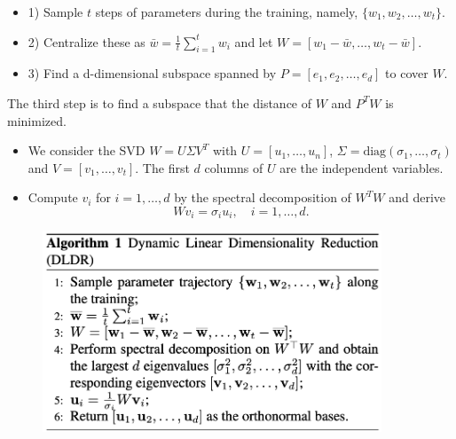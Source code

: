 \documentclass[t]{beamer}
\begin{document}
\begin{frame}
 \vspace{1cm}
\begin{itemize}
\item 1) Sample $t$ steps of parameters during the training, namely, $\{w_1, w_2, \dots , w_t \}$. \vspace{0,2cm}
\item 2) Centralize these as $\bar{w} = \frac{1}{t}\sum_{i=1}^{t} w_i$ and let $W = [ w_1 - \bar{w}, \dots, w_t - \bar{w}]$. \vspace{0,2cm}
\item 3) Find a d-dimensional subspace spanned by $P = [e_1,e_2,\dots,e_d]$ to cover $W$. \vspace{1cm}
\end{itemize}
The third step is to find a subspace that the distance of $W$ and $P^TW$ is minimized. \vspace{1cm}
\begin{itemize}
\item We consider the SVD $W=U\Sigma V^T$ with $U = [u_1, \dots, u_n]$, $\Sigma = \text{diag}(\sigma_1, \dots, \sigma_t)$ and $V = [v_1, \dots, v_t]$. The first $d$ columns of $U$ are the independent variables. \vspace{0,2cm}
\item Compute $v_i$ for $i=1, \dots, d$ by the spectral decomposition of $W^TW$ and derive
\[ Wv_i = \sigma_iu_i, \quad i=1, \dots, d. \]
\end{itemize}
\end{frame}



\begin{frame}
\begin{figure}
\includegraphics[width=0.9\textwidth]{dldr.png}
\end{figure}
\end{frame}
\end{document}
